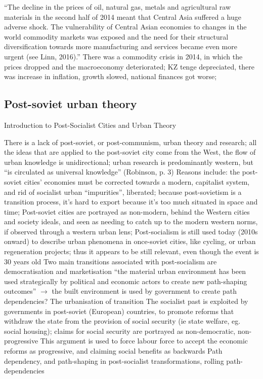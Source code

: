 \documentclass{article}
\begin{document}
\begin{outline}
		\2 ``The decline in the prices of oil, natural gas, metals and agricultural raw materials in the second half of 2014 meant that Central Asia suffered a huge adverse shock. The vulnerability of Central Asian economies to changes in the world commodity markets was exposed and the need for their structural diversification towards more manufacturing and services became even more urgent (see Linn, 2016).'' \cite{batsaikhan2017central}
			\3 There was a commodity crisis in 2014, in which the prices dropped and the macroeconomy deteriorated; KZ tenge depreciated, there was increase in inflation, growth slowed, national finances got worse;
\end{outline}

\subsection{Post-soviet urban theory}

Introduction to Post-Socialist Cities and Urban Theory\cite{ferenvcuhova2016introduction}

\begin{outline}
	\1 There is a lack of post-soviet, or post-communism, urban theory and research; all the ideas that are applied to the post-soviet city come from the West, the flow of urban knowledge is unidirectional; urban research is predominantly western, but ``is circulated as universal knowledge'' (Robinson, p. 3)
	\1 Reasons include: the post-soviet cities' economies must be corrected towards a modern, capitalist system, and rid of socialist urban ``impurities'', liberated; because post-sovietism is a transition process, it's hard to export because it's too much situated in space and time; 
	\1 Post-soviet cities are portrayed as non-modern, behind the Western cities and society ideals, and seen as needing to catch up to the modern western norms, if observed through a western urban lens; 
	\1 Post-socialism is still used today (2010s onward) to describe urban phenomena in once-soviet cities, like cycling, or urban regeneration projects; thus it appears to be still relevant, even though the event is 30 years old
	\1 Two main transitions associated with post-socialism are democratisation and marketisation
	\1 ``the material urban environment has been used strategically by political and economic actors to create new path-shaping outcomes'' $\rightarrow$ the built environment is used by government to create path dependencies? 
	\1 The urbanisation of transition
	\1 The socialist past is exploited by governments in post-soviet (European) countries, to promote reforms that withdraw the state from the provision of social security (ie state welfare, eg. social housing); claims for social security are portrayed as non-democratic, non-progressive
		\2 This argument is used to force labour force to accept the economic reforms as progressive, and claiming social benefits as backwards 
	\1 Path dependency, and path-shaping in post-socialist transformations, rolling path-dependencies
\end{outline}
\end{document}
